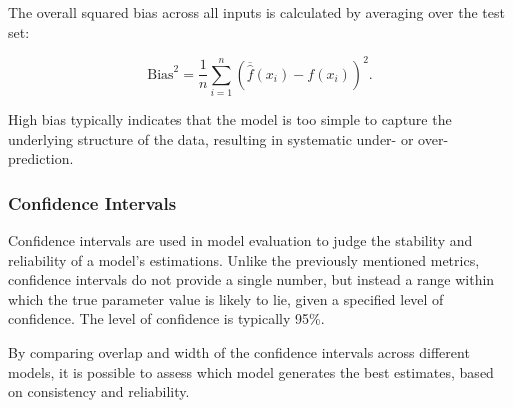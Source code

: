 \noindent The overall squared bias across all inputs is calculated by averaging over the test set:

\begin{equation}
\text{Bias}^2 = \frac{1}{n} \sum_{i=1}^{n} (\overline{\hat{f}}(x_i) - f(x_i))^{2}.
\end{equation}

\noindent High bias typically indicates that the model is too simple to capture the underlying structure of the data, resulting in systematic under- or over-prediction.



\subsubsection{Confidence Intervals}
Confidence intervals are used in model evaluation to judge the stability and reliability of a model's estimations. Unlike the previously mentioned metrics, confidence intervals do not provide a single number, but instead a range within which the true parameter value is likely to lie, given a specified level of confidence. The level of confidence is typically 95\%. \newline 

\noindent By comparing overlap and width of the confidence intervals across different models, it is possible to assess which model generates the best estimates, based on consistency and reliability.